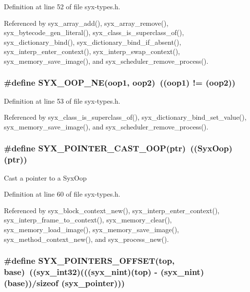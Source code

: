 Definition at line 52 of file syx-types.h.

Referenced by syx\_\-array\_\-add(), syx\_\-array\_\-remove(), syx\_\-bytecode\_\-gen\_\-literal(), syx\_\-class\_\-is\_\-superclass\_\-of(), syx\_\-dictionary\_\-bind(), syx\_\-dictionary\_\-bind\_\-if\_\-absent(), syx\_\-interp\_\-enter\_\-context(), syx\_\-interp\_\-swap\_\-context(), syx\_\-memory\_\-save\_\-image(), and syx\_\-scheduler\_\-remove\_\-process().\hypertarget{syx-types_8h_77fa18bf2a99d480c1947546d2f4d3da}{
\subsubsection{\setlength{\rightskip}{0pt plus 5cm}\#define SYX\_\-OOP\_\-NE(oop1, \/  oop2)~((oop1) != (oop2))}}
\label{syx-types_8h_77fa18bf2a99d480c1947546d2f4d3da}




Definition at line 53 of file syx-types.h.

Referenced by syx\_\-class\_\-is\_\-superclass\_\-of(), syx\_\-dictionary\_\-bind\_\-set\_\-value(), syx\_\-memory\_\-save\_\-image(), and syx\_\-scheduler\_\-remove\_\-process().\hypertarget{syx-types_8h_8efde12e307dd616a32f42327b3e80cc}{
\subsubsection{\setlength{\rightskip}{0pt plus 5cm}\#define SYX\_\-POINTER\_\-CAST\_\-OOP(ptr)~(({\bf SyxOop}) (ptr))}}
\label{syx-types_8h_8efde12e307dd616a32f42327b3e80cc}


Cast a pointer to a SyxOop 

Definition at line 60 of file syx-types.h.

Referenced by syx\_\-block\_\-context\_\-new(), syx\_\-interp\_\-enter\_\-context(), syx\_\-interp\_\-frame\_\-to\_\-context(), syx\_\-memory\_\-clear(), syx\_\-memory\_\-load\_\-image(), syx\_\-memory\_\-save\_\-image(), syx\_\-method\_\-context\_\-new(), and syx\_\-process\_\-new().\hypertarget{syx-types_8h_e109977ff8e34b7265d4442c9ec39560}{
\subsubsection{\setlength{\rightskip}{0pt plus 5cm}\#define SYX\_\-POINTERS\_\-OFFSET(top, \/  base)~(({\bf syx\_\-int32})((({\bf syx\_\-nint})(top) - ({\bf syx\_\-nint})(base))/sizeof ({\bf syx\_\-pointer})))}}
\label{syx-types_8h_e109977ff8e34b7265d4442c9ec39560}




